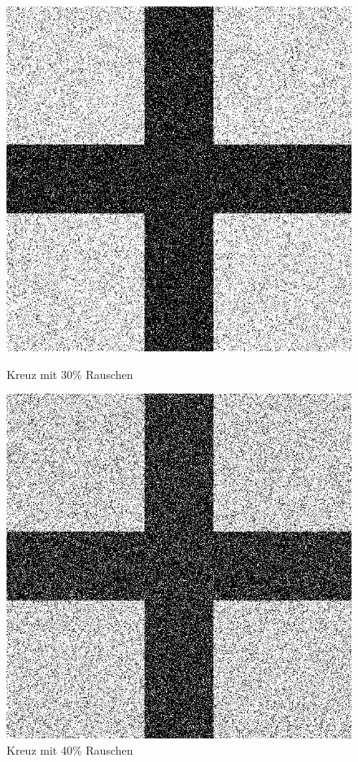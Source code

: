 \begin{figure}[hbt]
	\begin{minipage}{0.49 \textwidth}
		\includegraphics[width=\textwidth]{./Bilder/Auswertung/BeispielBilder/Picture_Crossing_noise_30_pixelCnt_128_featureCnt_5}
		\caption{Kreuz mit 30\% Rauschen}
	\end{minipage}
	\hfill
	\begin{minipage}{0.49 \textwidth}
		\includegraphics[width=\textwidth]{./Bilder/Auswertung/BeispielBilder/Picture_Crossing_noise_40_pixelCnt_128_featureCnt_5}
		\caption{Kreuz mit 40\% Rauschen}
	\end{minipage}
\end{figure}

